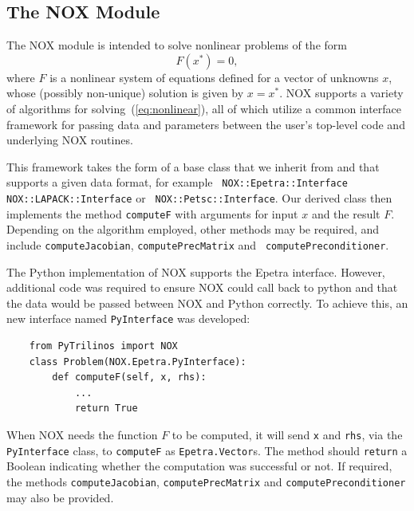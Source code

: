 \documentclass[acmtocl]{acmtrans2m}
\begin{document}
\subsection{The NOX Module}
\label{subsec:nox}

The NOX module is intended to solve nonlinear problems of the form
\begin{equation}
  \label{eq:nonlinear}
  F(x^*) = 0,
\end{equation}
where $F$ is a nonlinear system of equations defined for a vector of
unknowns $x$, whose (possibly non-unique) solution is given by
$x=x^*$.  NOX supports a variety of algorithms for
solving~(\ref{eq:nonlinear}), all of which utilize a common interface
framework for passing data and parameters between the user's top-level
code and underlying NOX routines.

This framework takes the form of a base class that we inherit from and
that supports a given data format, for example {\tt
  NOX::Epetra::Interface} {\tt NOX::LAPACK::Interface} or {\tt
  NOX::Petsc::Interface}.  Our derived class then implements the
method {\tt computeF} with arguments for input $x$ and the result $F$.
Depending on the algorithm employed, other methods may be required,
and include {\tt computeJacobian}, {\tt computePrecMatrix} and {\tt
  computePreconditioner}.

The Python implementation of NOX supports the Epetra interface.
However, additional code was required to ensure NOX could call back to
python and that the data would be passed between NOX and Python
correctly.  To achieve this, an new interface named {\tt PyInterface}
was developed:
\begin{verbatim}
    from PyTrilinos import NOX
    class Problem(NOX.Epetra.PyInterface):
        def computeF(self, x, rhs):
            ...
            return True
\end{verbatim}
When NOX needs the function $F$ to be computed, it will send {\tt x}
and {\tt rhs}, via the {\tt PyInterface} class, to {\tt computeF} as
{\tt Epetra.Vector}s.  The method should {\tt return} a Boolean
indicating whether the computation was successful or not.  If
required, the methods {\tt computeJacobian}, {\tt computePrecMatrix}
and {\tt computePreconditioner} may also be provided.
\end{document}
